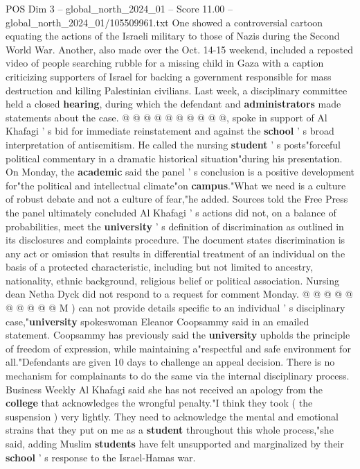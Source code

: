 \begin{textsample}{POS Dim 3 – global\_north\_2024\_01 – Score 11.00 – global\_north\_2024\_01/105509961.txt}
One showed a controversial cartoon equating the actions of the Israeli military to those of Nazis during the Second World War.
Another, also made over the Oct. 14-15 weekend, included a reposted video of people searching rubble for a missing child in Gaza with a caption criticizing supporters of Israel for backing a government responsible for mass destruction and killing Palestinian civilians.
Last week, a disciplinary committee held a closed \textbf{hearing}, during which the defendant and \textbf{administrators} made statements about the case. @ @ @ @ @ @ @ @ @ @, spoke in support of Al Khafagi ' s bid for immediate reinstatement and against the \textbf{school} ' s broad interpretation of antisemitism.
He called the nursing \textbf{student} ' s posts"forceful political commentary in a dramatic historical situation"during his presentation.
On Monday, the \textbf{academic} said the panel ' s conclusion is a positive development for"the political and intellectual climate"on \textbf{campus}."What we need is a culture of robust debate and not a culture of fear,"he added.
Sources told the Free Press the panel ultimately concluded Al Khafagi ' s actions did not, on a balance of probabilities, meet the \textbf{university} ' s definition of discrimination as outlined in its disclosures and complaints procedure.
The document states discrimination is any act or omission that results in differential treatment of an individual on the basis of a protected characteristic, including but not limited to ancestry, nationality, ethnic background, religious belief or political association.
Nursing dean Netha Dyck did not respond to a request for comment Monday. @ @ @ @ @ @ @ @ @ @ M ) can not provide details specific to an individual ' s disciplinary case,"\textbf{university} spokeswoman Eleanor Coopsammy said in an emailed statement.
Coopsammy has previously said the \textbf{university} upholds the principle of freedom of expression, while maintaining a"respectful and safe environment for all."Defendants are given 10 days to challenge an appeal decision.
There is no mechanism for complainants to do the same via the internal disciplinary process.
Business Weekly Al Khafagi said she has not received an apology from the \textbf{college} that acknowledges the wrongful penalty."I think they took ( the suspension ) very lightly.
They need to acknowledge the mental and emotional strains that they put on me as a \textbf{student} throughout this whole process,"she said, adding Muslim \textbf{students} have felt unsupported and marginalized by their \textbf{school} ' s response to the Israel-Hamas war.

\end{textsample}
